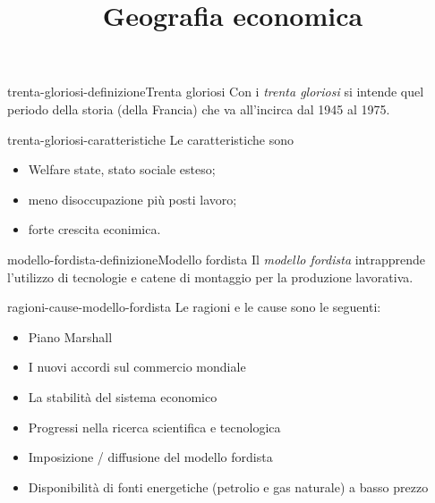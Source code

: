 \documentclass[preview]{standalone}
\begin{document}
\title{Geografia economica}
\genpage

\begin{snippetdefinition}{trenta-gloriosi-definizione}{Trenta gloriosi}
    Con i \textit{trenta gloriosi} si intende quel periodo della storia (della Francia)
    che va all'incirca dal 1945 al 1975.
\end{snippetdefinition}

\begin{snippet}{trenta-gloriosi-caratteristiche}
    Le caratteristiche sono
    \begin{itemize}
        \item Welfare state, stato sociale esteso;
        \item meno disoccupazione più posti lavoro;
        \item forte crescita econimica.
    \end{itemize}
\end{snippet}

\begin{snippetdefinition}{modello-fordista-definizione}{Modello fordista}
    Il \textit{modello fordista} intrapprende l'utilizzo di tecnologie e catene di montaggio
    per la produzione lavorativa.
\end{snippetdefinition}

\begin{snippet}{ragioni-cause-modello-fordista}
    Le ragioni e le cause sono le seguenti:
    \begin{itemize}
        \item Piano Marshall
        \item I nuovi accordi sul commercio mondiale
        \item La stabilità del sistema economico
        \item Progressi nella ricerca scientifica e tecnologica
        \item Imposizione / diffusione del modello fordista
        \item Disponibilità di fonti energetiche (petrolio e gas naturale) a basso prezzo
    \end{itemize}
\end{snippet}
\end{document}
